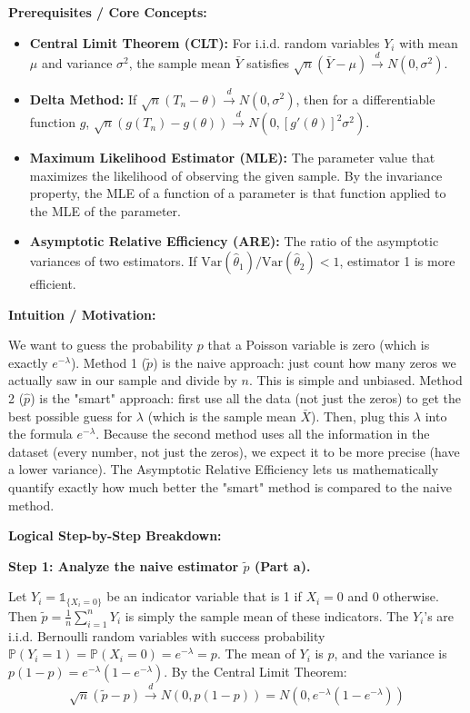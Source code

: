 \begin{solution}
\textbf{Prerequisites / Core Concepts:}
\begin{itemize}
    \item \textbf{Central Limit Theorem (CLT):} For i.i.d. random variables $Y_i$ with mean $\mu$ and variance $\sigma^2$, the sample mean $\bar{Y}$ satisfies $\sqrt{n}(\bar{Y} - \mu) \xrightarrow{d} N(0, \sigma^2)$.
    \item \textbf{Delta Method:} If $\sqrt{n}(T_n - \theta) \xrightarrow{d} N(0, \sigma^2)$, then for a differentiable function $g$, $\sqrt{n}(g(T_n) - g(\theta)) \xrightarrow{d} N(0, [g'(\theta)]^2 \sigma^2)$.
    \item \textbf{Maximum Likelihood Estimator (MLE):} The parameter value that maximizes the likelihood of observing the given sample. By the invariance property, the MLE of a function of a parameter is that function applied to the MLE of the parameter.
    \item \textbf{Asymptotic Relative Efficiency (ARE):} The ratio of the asymptotic variances of two estimators. If $\text{Var}(\hat{\theta}_1) / \text{Var}(\hat{\theta}_2) < 1$, estimator 1 is more efficient.
\end{itemize}

\textbf{Intuition / Motivation:}

We want to guess the probability $p$ that a Poisson variable is zero (which is exactly $e^{-\lambda}$). 
Method 1 ($\tilde{p}$) is the naive approach: just count how many zeros we actually saw in our sample and divide by $n$. This is simple and unbiased.
Method 2 ($\hat{p}$) is the "smart" approach: first use all the data (not just the zeros) to get the best possible guess for $\lambda$ (which is the sample mean $\bar{X}$). Then, plug this $\lambda$ into the formula $e^{-\lambda}$. 
Because the second method uses all the information in the dataset (every number, not just the zeros), we expect it to be more precise (have a lower variance). The Asymptotic Relative Efficiency lets us mathematically quantify exactly how much better the "smart" method is compared to the naive method.

\textbf{Logical Step-by-Step Breakdown:}

\textbf{Step 1: Analyze the naive estimator $\tilde{p}$ (Part a).}

Let $Y_i = \mathbb{1}_{\{X_i = 0\}}$ be an indicator variable that is 1 if $X_i = 0$ and 0 otherwise.
Then $\tilde{p} = \frac{1}{n} \sum_{i=1}^n Y_i$ is simply the sample mean of these indicators.
The $Y_i$'s are i.i.d. Bernoulli random variables with success probability $\mathbb{P}(Y_i = 1) = \mathbb{P}(X_i = 0) = e^{-\lambda} = p$.
The mean of $Y_i$ is $p$, and the variance is $p(1-p) = e^{-\lambda}(1 - e^{-\lambda})$.
By the Central Limit Theorem:
\[ \sqrt{n}(\tilde{p} - p) \xrightarrow{d} N(0, p(1-p)) = N(0, e^{-\lambda}(1 - e^{-\lambda})) \]


\end{solution}
